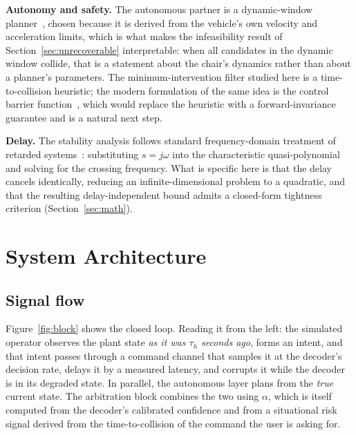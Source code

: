 \documentclass[11pt,a4paper]{article}
\theoremstyle{plain}
\theoremstyle{definition}
\begin{document}
\textbf{Autonomy and safety.} The autonomous partner is a dynamic-window
planner~\cite{fox1997dwa}, chosen because it is derived from the
vehicle's own velocity and acceleration limits, which is what makes the
infeasibility result of Section~\ref{sec:unrecoverable} interpretable: when all
candidates in the dynamic window collide, that is a statement about the
chair's dynamics rather than about a planner's parameters. The
minimum-intervention filter studied here is a time-to-collision
heuristic; the modern formulation of the same idea is the control barrier
function~\cite{ames2019cbf}, which would replace the heuristic with a
forward-invariance guarantee and is a natural next step.

\textbf{Delay.} The stability analysis follows standard frequency-domain
treatment of retarded systems~\cite{gu2003delay}: substituting
$s = j\omega$ into the characteristic quasi-polynomial and solving for
the crossing frequency. What is specific here is that the delay cancels
identically, reducing an infinite-dimensional problem to a quadratic, and
that the resulting delay-independent bound admits a closed-form
tightness criterion (Section~\ref{sec:math}).

\section{System Architecture}

\subsection{Signal flow}

Figure~\ref{fig:block} shows the closed loop. Reading it from the left:
the simulated operator observes the plant state \emph{as it was
$\tau_h$ seconds ago}, forms an intent, and that intent passes through
a command channel that samples it at the decoder's decision rate,
delays it by a measured latency, and corrupts it while the decoder is
in its degraded state. In parallel, the autonomous layer plans from the
\emph{true} current state. The arbitration block combines the two using
$\alpha$, which is itself computed from the decoder's calibrated
confidence and from a situational risk signal derived from the
time-to-collision of the command the user is asking for.
\end{document}
